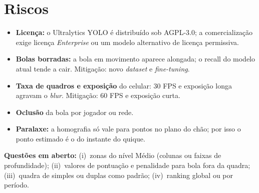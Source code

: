 \documentclass[a4paper,11pt]{article}
\begin{document}
\section{Riscos}
\begin{itemize}
  \item \textbf{Licença:} o Ultralytics YOLO é distribuído sob AGPL-3.0; a comercialização exige licença \textit{Enterprise} ou um modelo alternativo de licença permissiva.
  \item \textbf{Bolas borradas:} a bola em movimento aparece alongada; o recall do modelo atual tende a cair. Mitigação: novo \textit{dataset} e \textit{fine-tuning}.
  \item \textbf{Taxa de quadros e exposição} do celular: 30 FPS e exposição longa agravam o \textit{blur}. Mitigação: 60 FPS e exposição curta.
  \item \textbf{Oclusão} da bola por jogador ou rede.
  \item \textbf{Paralaxe:} a homografia só vale para pontos no plano do chão; por isso o ponto estimado é o do instante do quique.
\end{itemize}

\textbf{Questões em aberto:} (i)~zonas do nível Médio (colunas ou faixas de profundidade); (ii)~valores de pontuação e penalidade para bola fora da quadra; (iii)~quadra de simples ou duplas como padrão; (iv)~ranking global ou por período.

\end{document}
